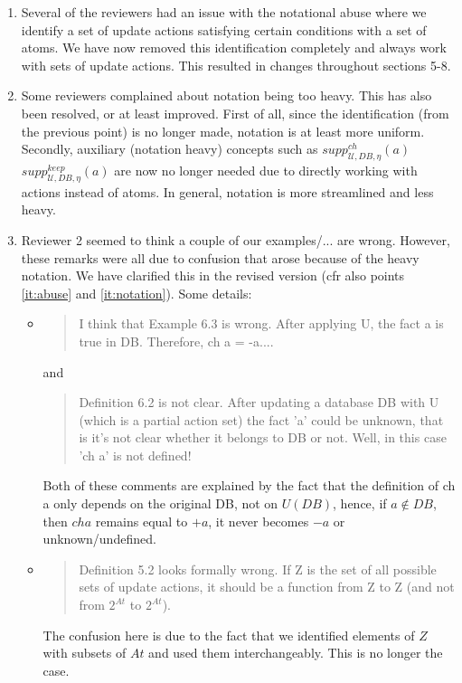 \documentclass{article}
\begin{document}
\begin{enumerate}
	  \item \label{it:abuse}Several of the reviewers had an issue with the notational abuse where we identify a set of update actions satisfying certain conditions with a set of atoms. We have now removed this identification completely and always work with sets of update actions.  This resulted in changes throughout sections 5-8.
	  \item \label{it:notation} Some reviewers complained about notation being too heavy. This has also been resolved, or at least improved. First of all, since the identification (from the previous point) is no longer made, notation is at least more uniform. Secondly, auxiliary (notation heavy) concepts such as $\mathit{supp}_{\mathcal{U},\mathit{DB},\eta}^{ch}(a)$ $\mathit{supp}_{\mathcal{U},\mathit{DB},\eta}^{keep}(a)$ are now no longer needed due to directly working with actions instead of atoms. In general, notation is more streamlined and less heavy. 
	  \item Reviewer 2 seemed to think a couple of our examples/... are wrong. However, these remarks were all due to confusion that arose because of the heavy notation. 
	  We have clarified this in the revised version (cfr also points \ref{it:abuse} and \ref{it:notation}). Some details: 
	  \begin{itemize}
	  \item \begin{quote}I think that Example 6.3 is wrong. After applying U, the fact a is true in DB.
Therefore, ch a = -a.... \end{quote} and 
\begin{quote}
 Definition 6.2 is not clear. After updating a database DB with U (which is a partial action set) the
fact 'a' could be unknown, that is it's not clear whether it belongs to DB or not.
Well, in this case 'ch a' is not defined!
\end{quote}
Both of these comments are explained by the fact that the definition of ch a only depends on the original DB, not on $U(DB)$, hence, if $a\not\in DB$, then  $ch a$ remains equal to $+a$, it never becomes $-a$ or unknown/undefined. 
	  \item \begin{quote}
	         Definition 5.2 looks formally wrong. If Z is the set of all possible sets of update actions, it should be a function from Z to Z (and not from $2^{At}$ to $2^{At}$).
	        \end{quote}
	         The confusion here is due to the fact that we identified elements of $Z$  with subsets of $At$ and used them interchangeably. This is no longer the case.
	      

\end{itemize}
\end{enumerate}
\end{document}
